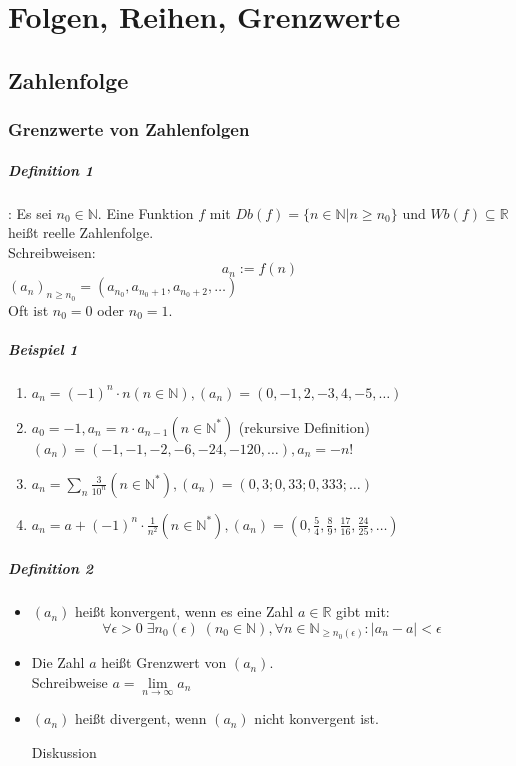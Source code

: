 \documentclass[a4paper]{scrartcl}
\begin{document}
\section{Folgen, Reihen, Grenzwerte}
\subsection{Zahlenfolge}
\subsubsection{Grenzwerte von Zahlenfolgen}
\subparagraph{Definition 1}: Es sei $n_0 \in \mathbb{N}$. Eine Funktion $f$ mit $Db(f) = \{ n \in \mathbb{N} | n \geq n_0 \} \text{ und } Wb(f) \subseteq \mathbb{R}$ heißt reelle Zahlenfolge.\\
Schreibweisen: \[a_n := f(n)\]
$(a_n)_{n\geq n_0} = (a_{n_0}, a_{n_0 +1 }, a_{n_0 +2 },\dots)$\\
Oft ist $n_0 = 0$ oder $ n_0=1$.

\subparagraph{Beispiel 1}
\begin{enumerate}
\item $a_n = (-1)^n \cdot n (n \in \mathbb{N}), (a_n) = (0,-1,2,-3,4,-5,\dots)$
\item $a_0 = -1, a_n = n \cdot a_{n-1} ( n \in \mathbb{N}^*)$ (rekursive Definition)\\
$(a_n)= (-1,-1,-2,-6,-24,-120,\dots), a_n= -n!$
\item $a_n= \sum\limits_n \frac{3}{10^n} (n\in\mathbb{N}^*), (a_n) = (0,3;0,33;0,333;\dots)$
\item $a_n = a + (-1)^n \cdot \frac{1}{n^2} (n \in \mathbb{N}^*), (a_n) = (0,\frac{5}{4},\frac{8}{9},\frac{17}{16},\frac{24}{25},\dots)$
\end{enumerate}

\subparagraph{Definition 2}
\begin{itemize}
\item $(a_n)$ heißt konvergent, wenn es eine Zahl $a \in \mathbb{R}$ gibt mit:
\[\forall \epsilon >0 \; \exists n_0(\epsilon)\; (n_0 \in \mathbb{N}), \forall n \in \mathbb{N}_{\geq n_0(\epsilon)}: \lvert a_n - a \rvert < \epsilon\]
\item Die Zahl $a$ heißt Grenzwert von $(a_n)$.\\
Schreibweise $a= \lim\limits_{n \to \infty} a_n$
\item $(a_n)$ heißt divergent, wenn $(a_n)$ nicht konvergent ist.

Diskussion 
\end{itemize}
\end{document}
